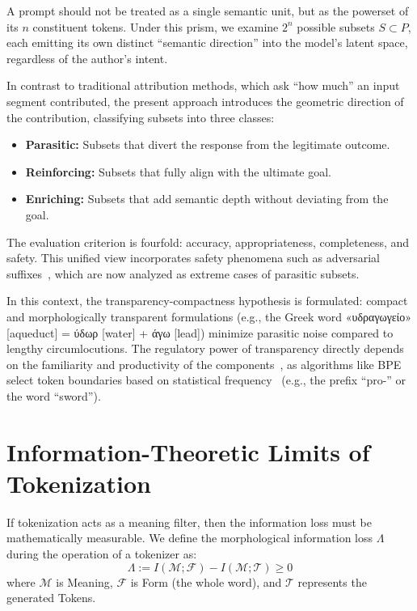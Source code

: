\documentclass[11pt,a4paper]{article}
\begin{document}
A prompt should not be treated as a single semantic unit, but as the powerset of its $n$ constituent tokens. Under this prism, we examine $2^n$ possible subsets $S \subset P$, each emitting its own distinct ``semantic direction'' into the model's latent space, regardless of the author's intent.

In contrast to traditional attribution methods, which ask ``how much'' an input segment contributed, the present approach introduces the geometric direction of the contribution, classifying subsets into three classes:

\begin{itemize}[leftmargin=*]
  \item \textbf{Parasitic:} Subsets that divert the response from the legitimate outcome.
  \item \textbf{Reinforcing:} Subsets that fully align with the ultimate goal.
  \item \textbf{Enriching:} Subsets that add semantic depth without deviating from the goal.
\end{itemize}

The evaluation criterion is fourfold: accuracy, appropriateness, completeness, and safety. This unified view incorporates safety phenomena such as adversarial suffixes~\cite{zou2023}, which are now analyzed as extreme cases of parasitic subsets.

In this context, the transparency-compactness hypothesis is formulated: compact and morphologically transparent formulations (e.g., the Greek word «υδραγωγείο» [aqueduct] = ύδωρ [water] + άγω [lead]) minimize parasitic noise compared to lengthy circumlocutions. The regulatory power of transparency directly depends on the familiarity and productivity of the components~\cite{hofmann2021}, as algorithms like BPE select token boundaries based on statistical frequency~\cite{bostrom2020,sennrich2016} (e.g., the prefix ``pro-'' or the word ``sword'').

\section{Information-Theoretic Limits of Tokenization}

If tokenization acts as a meaning filter, then the information loss must be mathematically measurable. We define the morphological information loss $\Lambda$ during the operation of a tokenizer as:
\begin{equation}
\Lambda := I(\mathcal{M}; \mathcal{F}) - I(\mathcal{M}; \mathcal{T}) \geq 0
\end{equation}
where $\mathcal{M}$ is Meaning, $\mathcal{F}$ is Form (the whole word), and $\mathcal{T}$ represents the generated Tokens.
\end{document}
